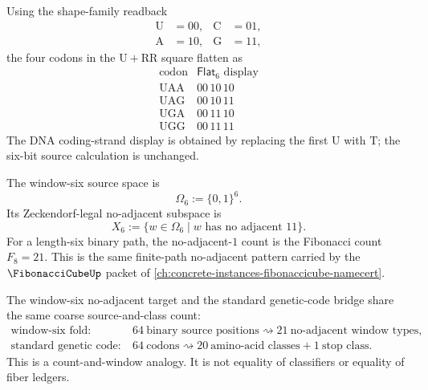 \begin{definition}
\label{def:philosophy-rna-two-axis-binary-display}
Using the shape-family readback
$$
\begin{aligned}
  \mathrm{U} &= 00,&
  \mathrm{C} &= 01,\\
  \mathrm{A} &= 10,&
  \mathrm{G} &= 11,
\end{aligned}
$$
the four codons in the $\mathrm{U}+\mathrm{RR}$ square flatten as
$$
\begin{array}{c|c}
  \text{codon} & \mathsf{Flat}_{6}\text{ display}\\
\hline
  \mathrm{UAA} & 00\,10\,10\\
  \mathrm{UAG} & 00\,10\,11\\
  \mathrm{UGA} & 00\,11\,10\\
  \mathrm{UGG} & 00\,11\,11
\end{array}
$$
The DNA coding-strand display is obtained by replacing the first
$\mathrm{U}$ with $\mathrm{T}$; the six-bit source calculation is
unchanged.
\end{definition}

\begin{definition}
\label{def:philosophy-window-six-zeckendorf-target}
The window-six source space is
$$
  \Omega_{6}:=\{0,1\}^{6}.
$$
Its Zeckendorf-legal no-adjacent subspace is
$$
  X_{6}:=
  \{w\in\Omega_{6}\mid w\text{ has no adjacent }11\}.
$$
For a length-six binary path, the no-adjacent-$1$ count is the
Fibonacci count $F_{8}=21$. This is the same finite-path no-adjacent
pattern carried by the $\FibonacciCubeUp$ packet of
\autoref{ch:concrete-instances-fibonaccicube-namecert}.
\end{definition}

\begin{corollary}
\label{cor:philosophy-two-parallel-sixty-four-to-twenty-one-readings}
The window-six no-adjacent target and the standard genetic-code bridge
share the same coarse source-and-class count:
$$
\begin{aligned}
  \text{window-six fold:}\quad
    &64\ \text{binary source positions}
      \rightsquigarrow 21\ \text{no-adjacent window types},\\
  \text{standard genetic code:}\quad
    &64\ \text{codons}
      \rightsquigarrow
      20\ \text{amino-acid classes}+1\ \text{stop class}.
\end{aligned}
$$
This is a count-and-window analogy. It is not equality of classifiers or
equality of fiber ledgers.
\end{corollary}


